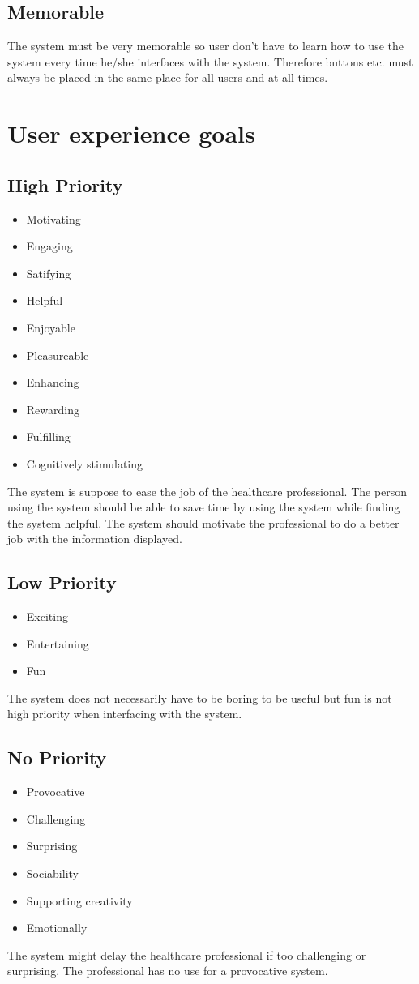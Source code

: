 \subsection{Memorable}
The system must be very memorable so user don't have to learn how to use the system every time he/she interfaces with the system. Therefore buttons etc. must always be placed in the same place for all users and at all times.


\section{User experience goals}
\subsection{High Priority}
\begin{itemize}
\item Motivating
\item Engaging
\item Satifying
\item Helpful
\item Enjoyable
\item Pleasureable
\item Enhancing
\item Rewarding
\item Fulfilling
\item Cognitively stimulating
\end{itemize}
The system is suppose to ease the job of the healthcare professional. The person using the system should be able to save time by using the system while finding the system helpful. The system should motivate the professional to do a better job with the information displayed. 

\subsection{Low Priority}
\begin{itemize}
\item Exciting
\item Entertaining
\item Fun
\end{itemize}
The system does not necessarily have to be boring to be useful but fun is not high priority when interfacing with the system.

\subsection{No Priority}
\begin{itemize}
\item Provocative
\item Challenging
\item Surprising
\item Sociability
\item Supporting creativity
\item Emotionally
\end{itemize}
The system might delay the healthcare professional if too challenging or surprising. The professional has no use for a provocative system. 

